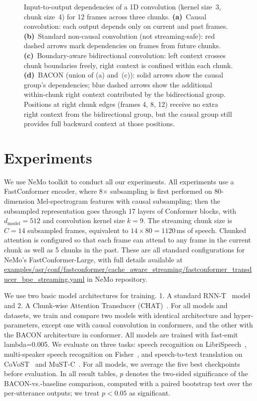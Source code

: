 \documentclass[cameraready]{Interspeech}
\begin{document}
\begin{figure}[t]
\caption{Input-to-output dependencies of a 1D convolution (kernel size~3,
chunk size~4) for 12 frames across three chunks.
\textbf{(a)}~Causal convolution: each output depends only on current and past
frames.
\textbf{(b)}~Standard non-causal convolution (not streaming-safe): \textcolor{red!65}{red dashed} arrows
mark dependencies on frames from future chunks.
\textbf{(c)}~Boundary-aware bidirectional convolution: left context crosses
chunk boundaries freely, right context is confined within each chunk.
\textbf{(d)}~BACON (union of (a) and~(c)): solid arrows show the causal
group's dependencies; \textcolor{blue!55}{blue dashed} arrows show the additional
within-chunk right context contributed by the bidirectional group.
Positions at right chunk edges (frames 4, 8, 12) receive no extra right
context from the bidirectional group, but the causal group still provides
full backward context at those positions.}
\label{fig:chunk_conv_deps}
\end{figure}

\section{Experiments}
\label{sec:experiments}

We use NeMo \cite{kuchaiev2019nemo} toolkit to conduct all our experiments. 
All experiments use a FastConformer encoder, where 8$\times$ subsampling is first performed on 80-dimension Mel-spectrogram features with causal subsampling; then the subsampled representation goes through 17 layers of Conformer blocks, with $d_{\text{model}}{=}512$ and convolution kernel size $k{=}9$. The streaming chunk size is $C{=}14$ subsampled frames, equivalent to $14 \times 80 = 1120$\,ms of speech. Chunked attention is configured so that each frame can attend to any frame in the current chunk as well as 5 chunks in the past. These are all standard configurations for NeMo's FastConformer-Large, with full details available at \url{examples/asr/conf/fastconformer/cache_aware_streaming/fastconformer_transducer_bpe_streaming.yaml} in NeMo repository.

We use two basic model architectures for training. 1. A standard RNN-T~\cite{graves2012sequence} model and 2. A Chunk-wise Attention Transducer (CHAT)~\cite{xu2026chunk}. 
For all models and datasets, we train and compare two models with identical architecture and hyper-parameters, except one with causal convolution in conformers, and the other with the BACON architecture in conformer. 
All models are trained with fast-emit lambda=0.005.
We evaluate on three tasks: speech recognition on LibriSpeech~\cite{panayotov2015librispeech}, multi-speaker speech
recognition on Fisher~\cite{cieri2004fisher},
and speech-to-text translation on CoVoST~\cite{wang2021covost2} and MuST-C~\cite{di-gangi-etal-2019-must}. For all models, we average the five best checkpoints before evaluation.
In all result tables, $p$ denotes the two-sided significance of the BACON-vs.-baseline comparison, computed with a paired bootstrap test over the per-utterance outputs; we treat $p<0.05$ as significant.
\end{document}
